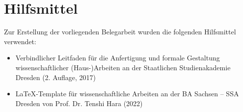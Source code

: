 \renewcommand{\refname}{Quellenverzeichnis}

\cleardoublepage

\begin{spacing}{1} %
	
	\thispagestyle{plain}

	\label{bibliography}
\end{spacing}

\clearpage\section*{Hilfsmittel} Zur Erstellung der vorliegenden Belegarbeit
wurden die folgenden Hilfsmittel verwendet:

\begin{itemize}
	\item Verbindlicher Leitfaden für die Anfertigung und formale Gestaltung
	wissenschaftlicher (Haus-)Arbeiten an der Staatlichen Studienakademie
	Dresden (2. Auflage, 2017)

	\item \LaTeX-Template für wissenschaftliche Arbeiten an der BA Sachsen --
	SSA Dresden von Prof. Dr. Tenshi Hara (2022)
\end{itemize}